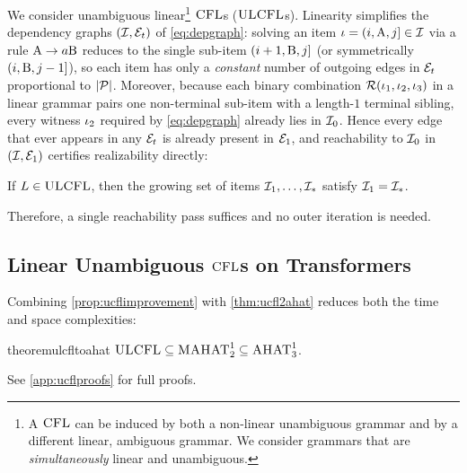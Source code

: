 \documentclass{article}
\begin{document}
We consider unambiguous linear\footnote{A ${\textsc{CFL}}$ can be induced by both a non-linear unambiguous grammar and by a different linear, ambiguous grammar. We consider grammars that are \emph{simultaneously} linear and unambiguous.} ${\textsc{CFL}}$s (${\textsc{ULCFL}}$s).
Linearity simplifies the dependency graphs $({{\mathcal{I}}}, {\mathcal{E}}_t)$ of \cref{eq:depgraph}: solving an item ${{ \iota}} = ({{ i}}, {{ \mathrm{A}}}, {{ j}}] \in {{\mathcal{I}}}$ via a rule ${{ {{ \mathrm{A}}} \rightarrow {{a}} {{ \mathrm{B}}}}}$ reduces to the single sub-item $({{ i}}+1, {{ \mathrm{B}}}, {{ j}}]$ (or symmetrically $({{ i}}, {{ \mathrm{B}}}, {{ j}}-1]$), so each item has only a \emph{constant} number of outgoing edges in ${\mathcal{E}}_t$ proportional to $|{{ \mathcal{P}}}|$. 
Moreover, because each binary combination ${{{ \mathcal{R}}}}({{ \iota}}_1, {{ \iota}}_2, {{ \iota}}_3)$ in a linear grammar pairs one non-terminal sub-item with a length-$1$ terminal sibling, every witness ${{ \iota}}_2$ required by \cref{eq:depgraph} already lies in ${{\mathcal{I}}}_0$. Hence every edge that ever appears in any ${\mathcal{E}}_t$ is already present in ${\mathcal{E}}_1$, and reachability to ${{\mathcal{I}}}_0$ in $({{\mathcal{I}}}, {\mathcal{E}}_1)$ certifies realizability directly:
\begin{proposition}\label{prop:ucflimprovement}
    If ${L} \in {\textsc{ULCFL}}$, then the growing set of items ${{\mathcal{I}}}_1,\ldots,{{\mathcal{I}}}_*$ satisfy ${{\mathcal{I}}}_1 = {{\mathcal{I}}}_*$.
\end{proposition}
Therefore, a single reachability pass suffices and no outer iteration is needed.

\subsection{Linear Unambiguous ${\textsc{CFL}}$s on Transformers}\label{subsec:linearahat}
Combining \cref{prop:ucflimprovement} with \cref{thm:ucfl2ahat} reduces both the time and space complexities:
\begin{restatable}{theorem}{ulcfltoahat}\label{thm:ulcfl2ahat}
    ${\textsc{ULCFL}} \subseteq {{\textsc{MAHAT}}}^{1}_{2} \subseteq {{\textsc{AHAT}}}^1_3$.
\end{restatable}
See \cref{app:ucflproofs} for full proofs.
\end{document}
